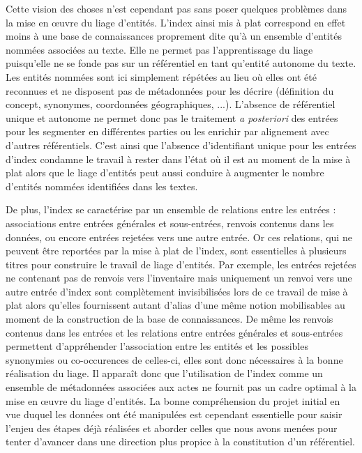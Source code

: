 \documentclass[a4paper,12pt,twoside]{book}
\begin{document}
	Cette vision des choses n'est cependant pas sans poser quelques problèmes dans la mise en œuvre du liage d'entités. L'index ainsi mis à plat correspond en effet moins à une base de connaissances proprement dite qu'à un ensemble d'entités nommées associées au texte. Elle ne permet pas l'apprentissage du liage puisqu'elle ne se fonde pas sur un référentiel en tant qu'entité autonome du texte. Les entités nommées sont ici simplement répétées au lieu où elles ont été reconnues et ne disposent pas de métadonnées pour les décrire (définition du concept, synonymes, coordonnées géographiques, ...). L'absence de référentiel unique et autonome ne permet donc pas le traitement \textit{a posteriori} des entrées pour les segmenter en différentes parties ou les enrichir par alignement avec d'autres référentiels. C'est ainsi que l'absence d'identifiant unique pour les entrées d'index condamne le travail à rester dans l'état où il est au moment de la mise à plat alors que le liage d'entités peut aussi conduire à augmenter le nombre d'entités nommées identifiées dans les textes.
	
	De plus, l'index se caractérise par un ensemble de relations entre les entrées : associations entre entrées générales et sous-entrées, renvois contenus dans les données, ou encore entrées rejetées vers une autre entrée. Or ces relations, qui ne peuvent être reportées par la mise à plat de l'index, sont essentielles à plusieurs titres pour construire le travail de liage d'entités.  Par exemple, les entrées rejetées ne contenant pas de renvois vers l'inventaire mais uniquement un renvoi vers une autre entrée d'index sont complètement invisibilisées lors de ce travail de mise à plat alors qu'elles fournissent autant d'alias d'une même notion mobilisables au moment de la construction de la base de connaissances. De même les renvois contenus dans les entrées et les relations entre entrées générales et sous-entrées permettent d'appréhender l'association entre les entités et les possibles synonymies ou co-occurences de celles-ci, elles sont donc nécessaires à la bonne réalisation du liage. Il apparaît donc que l'utilisation de l'index comme un ensemble de métadonnées associées aux actes ne fournit pas un cadre optimal à la mise en œuvre du liage d'entités. La bonne compréhension du projet initial en vue duquel les données ont été manipulées est cependant essentielle pour saisir l'enjeu des étapes déjà réalisées et aborder celles que nous avons menées pour tenter d'avancer dans une direction plus propice à la constitution d'un référentiel.
	
\end{document}

